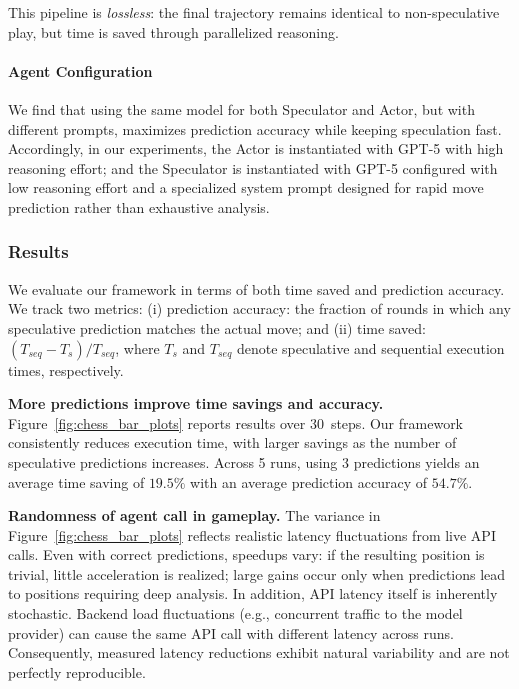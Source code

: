 This pipeline is \textit{lossless}: the final trajectory remains identical to non-speculative play, but time is saved through parallelized reasoning.

\paragraph{Agent Configuration} We find that using the same model for both Speculator and Actor, but with different prompts, maximizes prediction accuracy while keeping speculation fast. Accordingly, in our experiments, the Actor is instantiated with GPT-5 with high reasoning effort; and the Speculator is instantiated with GPT-5 configured with low reasoning effort and a specialized system prompt designed for rapid move prediction rather than exhaustive analysis.

\subsubsection{Results}
We evaluate our framework in terms of both time saved and prediction accuracy. We track two metrics: (i) prediction accuracy: the fraction of rounds in which any speculative prediction matches the actual move; and (ii) time saved:  $(T_{seq}-T_{s})/T_{seq}$, where $T_{s}$ and $T_{seq}$ denote speculative and sequential execution times, respectively.

\textbf{More predictions improve time savings and accuracy.}
Figure~\ref{fig:chess_bar_plots} reports results over 30~steps. Our framework consistently reduces execution time, with larger savings as the number of speculative predictions increases. Across 5 runs, using 3 predictions yields an average time saving of $19.5\%$ with an average prediction accuracy of $54.7\%$.

\textbf{Randomness of agent call in gameplay.}
The variance in Figure~\ref{fig:chess_bar_plots} reflects realistic latency fluctuations from live API calls. Even with correct predictions, speedups vary: if the resulting position is trivial, little acceleration is realized; large gains occur only when predictions lead to positions requiring deep analysis.
%
In addition, API latency itself is inherently stochastic. Backend load fluctuations (e.g., concurrent traffic to the model provider) can cause the same API call with different latency across runs. 
Consequently, measured latency reductions exhibit natural variability and are not perfectly reproducible.